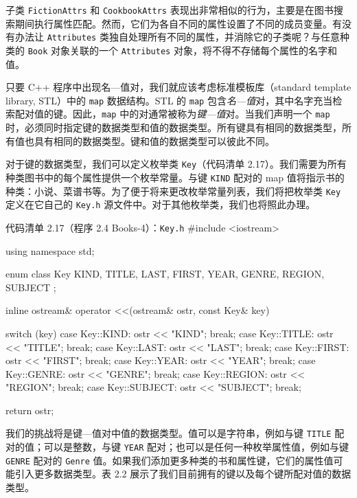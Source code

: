 子类 \texttt{Fiction\allowbreak{}Attrs} 和 \texttt{Cookbook\allowbreak{}Attrs} 表现出非常相似的行为，主要是在图书搜索期间执行属性匹配。然而，它们为各自不同的属性设置了不同的成员变量。有没有办法让 \texttt{Attributes} 类独自处理所有不同的属性，并消除它的子类呢？与任意种类的 \texttt{Book} 对象关联的一个 \texttt{Attributes} 对象，将不得不存储每个属性的名字和值。

只要 C++ 程序中出现名—值对，我们就应该考虑标准模板库（standard template library, STL）中的 \texttt{map} 数据结构。STL 的 \texttt{map} 包含\emph{名—值}对，其中名字充当检索配对值的键。因此，\texttt{map} 中的对通常被称为\emph{键—值}对。当我们声明一个 \texttt{map} 时，必须同时指定键的数据类型和值的数据类型。所有键具有相同的数据类型，所有值也具有相同的数据类型。键和值的数据类型可以彼此不同。

对于键的数据类型，我们可以定义枚举类 \texttt{Key}（代码清单 2.17）。我们需要为所有种类图书中的每个属性提供一个枚举常量。与键 \texttt{KIND} 配对的 map 值将指示书的种类：小说、菜谱书等。为了便于将来更改枚举常量列表，我们将把枚举类 \texttt{Key} 定义在它自己的 \texttt{Key.h} 源文件中。对于其他枚举类，我们也将照此办理。

\begin{codeboxt}{代码清单 2.17（程序 2.4 Books-4）：\texttt{Key.h}}
#include <iostream>

using namespace std;

enum class Key
{
    KIND, TITLE, LAST, FIRST, YEAR, GENRE, REGION, SUBJECT
};

inline ostream& operator <<(ostream& ostr, const Key& key)
{
    switch (key)
    {
        case Key::KIND:    ostr << "KIND";    break;
        case Key::TITLE:   ostr << "TITLE";   break;
        case Key::LAST:    ostr << "LAST";    break;
        case Key::FIRST:   ostr << "FIRST";   break;
        case Key::YEAR:    ostr << "YEAR";    break;
        case Key::GENRE:   ostr << "GENRE";   break;
        case Key::REGION:  ostr << "REGION";  break;
        case Key::SUBJECT: ostr << "SUBJECT"; break;
    }

    return ostr;
}
\end{codeboxt}

我们的挑战将是键—值对中值的数据类型。值可以是字符串，例如与键 \texttt{TITLE} 配对的值；可以是整数，与键 \texttt{YEAR} 配对；也可以是任何一种枚举属性值，例如与键 \texttt{GENRE} 配对的 \texttt{Genre} 值。如果我们添加更多种类的书和属性键，它们的属性值可能引入更多数据类型。表 2.2 展示了我们目前拥有的键以及每个键所配对值的数据类型。

